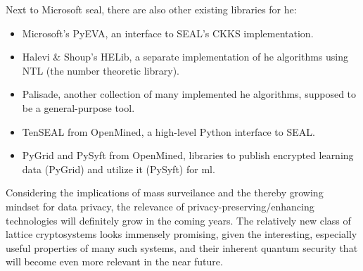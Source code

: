 Next to Microsoft \gls{seal}, there are also other existing libraries for \gls{he}:
\begin{itemize}[noitemsep]
  \item Microsoft's PyEVA, an interface to SEAL's CKKS implementation.
  \item Halevi \& Shoup's HELib, a separate implementation of \gls{he} algorithms using NTL (the number theoretic library).
  \item Palisade, another collection of many implemented \gls{he} algorithms, supposed to be a general-purpose tool.
  \item TenSEAL from OpenMined, a high-level Python interface to SEAL.
  \item PyGrid and PySyft from OpenMined, libraries to publish encrypted learning data (PyGrid) and utilize it (PySyft) for \gls{ml}.
\end{itemize}

Considering the implications of mass surveilance and the thereby growing mindset for data privacy, the relevance of privacy-preserving/enhancing technologies will definitely grow in the coming years.
The relatively new class of lattice cryptosystems looks immensely promising, given the interesting, especially useful properties of many such systems, and their inherent quantum security that will become even more relevant in the near future.
